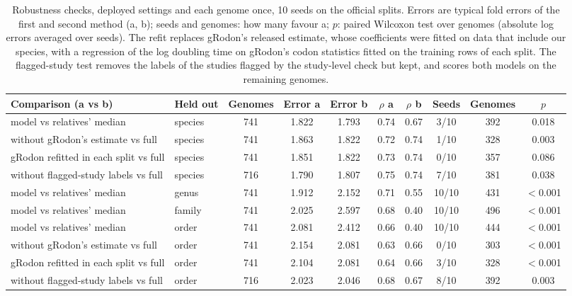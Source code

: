 \begin{table}[ht]\centering\footnotesize\setlength{\tabcolsep}{3pt}
\caption{Robustness checks, deployed settings and each genome once, 10 seeds on the official splits. Errors are typical fold errors of the first and second method (a, b); seeds and genomes: how many favour a; $p$: paired Wilcoxon test over genomes (absolute log errors averaged over seeds). The refit replaces gRodon's released estimate, whose coefficients were fitted on data that include our species, with a regression of the log doubling time on gRodon's codon statistics fitted on the training rows of each split. The flagged-study test removes the labels of the studies flagged by the study-level check but kept, and scores both models on the remaining genomes.}\label{tab:robust}
\begin{tabular}{llcccccccc}
\toprule
Comparison (a vs b) & Held out & Genomes & Error a & Error b & $\rho$ a & $\rho$ b & Seeds & Genomes & $p$ \\
\midrule
model vs relatives' median & species & 741 & 1.822 & 1.793 & 0.74 & 0.67 & 3/10 & 392 & 0.018 \\
without gRodon's estimate vs full & species & 741 & 1.863 & 1.822 & 0.72 & 0.74 & 1/10 & 328 & 0.003 \\
gRodon refitted in each split vs full & species & 741 & 1.851 & 1.822 & 0.73 & 0.74 & 0/10 & 357 & 0.086 \\
without flagged-study labels vs full & species & 716 & 1.790 & 1.807 & 0.75 & 0.74 & 7/10 & 381 & 0.038 \\
model vs relatives' median & genus & 741 & 1.912 & 2.152 & 0.71 & 0.55 & 10/10 & 431 & $<$0.001 \\
model vs relatives' median & family & 741 & 2.025 & 2.597 & 0.68 & 0.40 & 10/10 & 496 & $<$0.001 \\
model vs relatives' median & order & 741 & 2.081 & 2.412 & 0.66 & 0.40 & 10/10 & 444 & $<$0.001 \\
without gRodon's estimate vs full & order & 741 & 2.154 & 2.081 & 0.63 & 0.66 & 0/10 & 303 & $<$0.001 \\
gRodon refitted in each split vs full & order & 741 & 2.104 & 2.081 & 0.64 & 0.66 & 3/10 & 328 & $<$0.001 \\
without flagged-study labels vs full & order & 716 & 2.023 & 2.046 & 0.68 & 0.67 & 8/10 & 392 & 0.003 \\
\bottomrule
\end{tabular}
\end{table}
